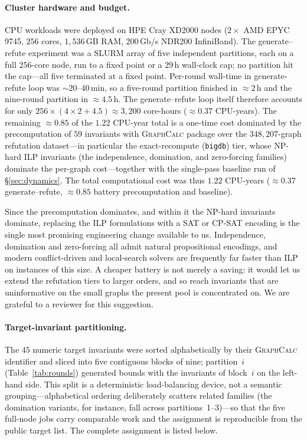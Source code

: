 \documentclass[]{ceurart}
\begin{document}
\paragraph{Cluster hardware and budget.}
CPU workloads were deployed on HPE Cray XD2000 nodes ($2\times$ AMD EPYC 9745, $256$ cores,
$1{,}536$\,GB RAM, 200\,Gb/s NDR200 InfiniBand). The generate--refute experiment was a SLURM array of five independent
partitions, each on a full $256$-core node, run to a fixed point or a $29$\,h wall-clock cap; no partition
hit the cap---all five terminated at a fixed point. Per-round wall-time in generate-refute loop was
$\sim\!20$--$40$\,min, so a five-round partition finished in $\approx\!2$\,h and the
nine-round partition in $\approx\!4.5$\,h. The generate--refute loop itself therefore
accounts for only $256\times(4\times2+4.5)\approx3{,}200$ core-hours ($\approx\!0.37$
CPU-years). The remaining $\approx\!0.85$ of the $1.22$ CPU-year total is a one-time
cost dominated by the precomputation of  $59$ invariants with \textsc{GraphCalc} package
 over the $348{,}207$-graph refutation dataset---in particular the
exact-recompute (\texttt{bigdb}) tier, whose NP-hard ILP invariants (the
independence, domination, and zero-forcing families) dominate the per-graph
cost---together with the single-pass baseline run of \S\ref{sec:dynamics}. The
total computational cost was thus $1.22$ CPU-years ($\approx\!0.37$ generate--refute,
$\approx\!0.85$ battery precomputation and baseline).

Since the precomputation dominates, and within it the NP-hard invariants
dominate, replacing the ILP formulations with a SAT or CP-SAT encoding is the
single most promising engineering change available to us. Independence,
domination and zero-forcing all admit natural propositional encodings, and
modern conflict-driven and local-search solvers are frequently far faster than
ILP on instances of this size. A cheaper battery is not merely a saving: it
would let us extend the refutation tiers to larger orders, and so reach
invariants that are uninformative on the small graphs the present pool is
concentrated on. We are grateful to a reviewer for this suggestion.

\paragraph{Target-invariant partitioning.}
The $45$ numeric target invariants were sorted alphabetically by their
\textsc{GraphCalc} identifier and sliced into five contiguous blocks of nine; partition~$i$
(Table~\ref{tab:rounds}) generated bounds with the invariants of block~$i$ on the left-hand
side. This split is a deterministic load-balancing device, not a semantic grouping---alphabetical
ordering deliberately scatters related families (the domination variants, for instance, fall across
partitions~1--3)---so that the five full-node jobs carry comparable work and the assignment is
reproducible from the public target list. The complete assignment is listed below.
\end{document}
